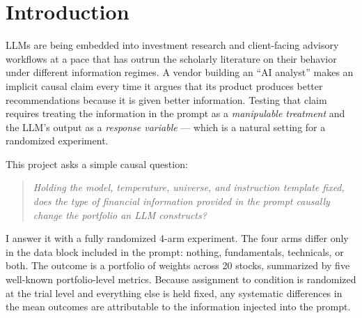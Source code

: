 \documentclass[11pt]{article}
\begin{document}
\begin{abstract}
arm at the allocation level (Claude concentrates under fundamental,
Gemini concentrates under technical, GPT-4o concentrates under
neither), yet realized 12-month returns end up ordered identically
across all three (fundamental $>$ control $>$ combined $>$ technical). Finally, a forward-looking
backtest from April~2025 to April~2026 finds that the fundamental-prompt
portfolios outperformed the control by $+5.3$ percentage points on average
across models, while technical-prompt portfolios underperformed the
control by $-12.4$ percentage points --- demonstrating that the causal
effect of prompt framing has an economically meaningful realization in
markets, not just in concentration metrics. The experiment demonstrates that information
framing is a causal driver of LLM portfolio behavior that is practically
detectable with modest sample sizes and replicable across vendors.
\end{abstract}


\section{Introduction}

LLMs are being embedded into investment research and client-facing advisory
workflows at a pace that has outrun the scholarly literature on their
behavior under different information regimes. A vendor building an ``AI
analyst'' makes an implicit causal claim every time it argues that its
product produces better recommendations because it is given better
information. Testing that claim requires treating the information in the
prompt as a \emph{manipulable treatment} and the LLM's output as a
\emph{response variable} --- which is a natural setting for a randomized
experiment.

This project asks a simple causal question:

\begin{quote}
\emph{Holding the model, temperature, universe, and instruction template fixed,
does the type of financial information provided in the prompt causally change
the portfolio an LLM constructs?}
\end{quote}

I answer it with a fully randomized 4-arm experiment. The four arms differ
only in the data block included in the prompt: nothing, fundamentals,
technicals, or both. The outcome is a portfolio of weights across 20 stocks,
summarized by five well-known portfolio-level metrics. Because assignment
to condition is randomized at the trial level and everything else is held
fixed, any systematic differences in the mean outcomes are attributable to
the information injected into the prompt.
\end{document}
